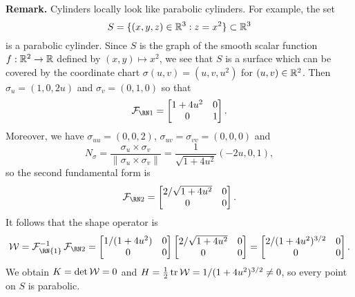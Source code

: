 \begin{enumerate}[(1)]
    {\bf Remark.} Cylinders locally look like parabolic cylinders. For example, 
    the set 
    \[ S = \{(x, y, z) \in \mathbb{R}^3 : z = x^2\} \subset \mathbb{R}^3 \] 
    is a parabolic cylinder. Since $S$ is the graph of the smooth 
    scalar function $f : \mathbb{R}^2 \to \mathbb{R}$ defined by $(x, y) \mapsto x^2$, 
    we see that $S$ is a surface which can be covered by the coordinate 
    chart $\sigma(u, v) = (u, v, u^2)$ for $(u, v) \in \mathbb{R}^2$. Then 
    $\sigma_u = (1, 0, 2u)$ and $\sigma_v = (0, 1, 0)$ so that 
    \[ \FFF = \begin{bmatrix}
        1+4u^2 & 0 \\ 0 & 1
    \end{bmatrix}. \]
    Moreover, we have $\sigma_{uu} = (0, 0, 2)$, $\sigma_{uv} = \sigma_{vv} 
    = (0, 0, 0)$ and 
    \[ N_\sigma = \frac{\sigma_u \times \sigma_v}{\|\sigma_u \times \sigma_v\|} 
    = \frac{1}{\sqrt{1+4u^2}}(-2u, 0, 1), \] 
    so the second fundamental form is 
    \[ \SFF = \begin{bmatrix}
        2/\sqrt{1+4u^2} & 0 \\ 0 & 0 
    \end{bmatrix}. \] 
    It follows that the shape operator is 
    \[ {\cal W} = {\cal F}_{\text{\RN{1}}}^{-1} \SFF 
    = \begin{bmatrix}
        1/(1+4u^2) & 0 \\ 0 & 0 
    \end{bmatrix} \begin{bmatrix}
        2/\sqrt{1+4u^2} & 0 \\ 0 & 0 
    \end{bmatrix} = \begin{bmatrix}
        2/(1+4u^2)^{3/2} & 0 \\ 0 & 0 
    \end{bmatrix}. \] 
    We obtain $K = \det{\cal W} = 0$ and 
    $H = \frac12\operatorname{tr}{\cal W} = 1/(1+4u^2)^{3/2} \neq 0$, so every point on $S$ 
    is parabolic.


\end{enumerate}
